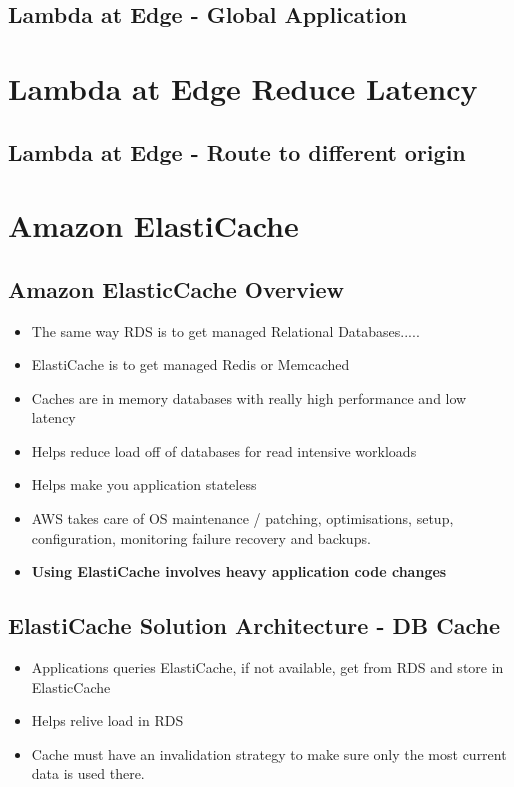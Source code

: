 \subsection{Lambda at Edge - Global Application}


\section{Lambda at Edge Reduce Latency}

\subsection{Lambda at Edge - Route to different origin}


\section{Amazon ElastiCache}

\subsection{Amazon ElasticCache Overview}
\begin{itemize}
    \item The same way RDS is to get managed Relational Databases.....
    \item ElastiCache is to get managed Redis or Memcached
    \item Caches are in memory databases with really high performance and low latency
    \item Helps reduce load off of databases for read intensive workloads
    \item Helps make you application stateless
    \item AWS takes care of OS maintenance / patching, optimisations, setup, configuration, monitoring failure recovery and backups.
    \item \textbf{Using ElastiCache involves heavy application code changes}
\end{itemize}

\subsection{ElastiCache Solution Architecture - DB Cache}
\begin{itemize}
    \item Applications queries ElastiCache, if not available, get from RDS and store in ElasticCache
    \item Helps relive load in RDS
    \item Cache must have an invalidation strategy to make sure only the most current data is used there.
\end{itemize}

